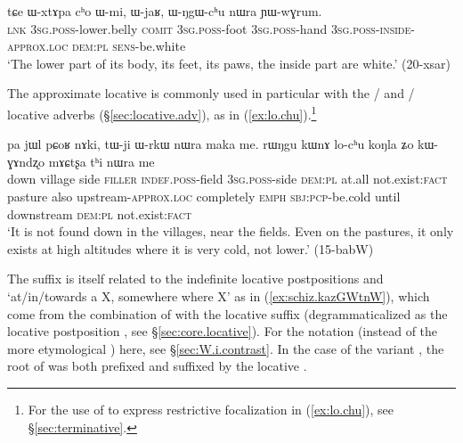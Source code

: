   \begin{exe}
\ex \label{ex:WNgW.chu}
 \gll tɕe ɯ-xtɤpa cʰo ɯ-mi, ɯ-jaʁ, ɯ-ŋgɯ-cʰu nɯra ɲɯ-wɣrum. \\
\textsc{lnk} \textsc{3sg}.\textsc{poss}-lower.belly \textsc{comit}  \textsc{3sg}.\textsc{poss}-foot  \textsc{3sg}.\textsc{poss}-hand  \textsc{3sg}.\textsc{poss}-\textsc{inside}-\textsc{approx}.\textsc{loc} \textsc{dem}:\textsc{pl}  \textsc{sens}-be.white \\
\glt `The lower part of its body, its feet, its paws, the inside part are white.' (20-xsar)
    \end{exe}

The approximate locative  is commonly used in particular with the  /  and  /  locative adverbs (§\ref{sec:locative.adv}), as in (\ref{ex:lo.chu}).\footnote{For the use of  to express restrictive focalization in (\ref{ex:lo.chu}), see §\ref{sec:terminative}. }

\begin{exe}
\ex \label{ex:lo.chu}
 \gll  pa jɯl pɕoʁ nɤki, tɯ-ji ɯ-rkɯ nɯra maka me. rɯŋgu kɯnɤ lo-cʰu koŋla ʑo kɯ-ɣɤndʐo mɤɕtʂa tʰi nɯra me \\
 down village side \textsc{filler} \textsc{indef}.\textsc{poss}-field \textsc{3sg}.\textsc{poss}-side \textsc{dem}:\textsc{pl} at.all not.exist:\textsc{fact} pasture also upstream-\textsc{approx}.\textsc{loc} completely \textsc{emph} \textsc{sbj}:\textsc{pcp}-be.cold until downstream \textsc{dem}:\textsc{pl} not.exist:\textsc{fact} \\
\glt  `It is not found down in the villages, near the fields. Even on the pastures, it only exists at high altitudes where it is very cold, not lower.' (15-babW)
\end{exe}
 
The suffix  is itself related to the indefinite locative postpositions  and  `at/in/towards a X, somewhere where X' as in (\ref{ex:schiz.kazGWtnW}), which come from the combination of  with the locative suffix  (degrammaticalized as the locative postposition , see §\ref{sec:core.locative}). For the notation  (instead of the more etymological ) here, see §\ref{sec:W.i.contrast}. In the case of the variant , the root of  was both prefixed and suffixed by the locative .

